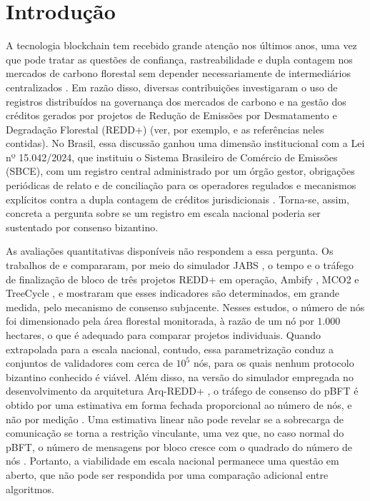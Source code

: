 \section{Introdução}
\label{sec:intro}

A tecnologia blockchain tem recebido grande atenção nos últimos anos, uma vez que pode tratar as questões de confiança, rastreabilidade e dupla contagem nos mercados de carbono florestal sem depender necessariamente de intermediários centralizados \citep{Howson2019ncc,Kotsialou2022}. Em razão disso, diversas contribuições investigaram o uso de registros distribuídos na governança dos mercados de carbono e na gestão dos créditos gerados por projetos de Redução de Emissões por Desmatamento e Degradação Florestal (REDD+) (ver, por exemplo, \citep{Howson2019geoforum,Kotsialou2021,Marke2022,Vilkov2023,He2022} e as referências neles contidas). No Brasil, essa discussão ganhou uma dimensão institucional com a Lei nº 15.042/2024, que instituiu o Sistema Brasileiro de Comércio de Emissões (SBCE), com um registro central administrado por um órgão gestor, obrigações periódicas de relato e de conciliação para os operadores regulados e mecanismos explícitos contra a dupla contagem de créditos jurisdicionais \citep{Lei15042}. Torna-se, assim, concreta a pergunta sobre se um registro em escala nacional poderia ser sustentado por consenso bizantino.

As avaliações quantitativas disponíveis não respondem a essa pergunta. Os trabalhos de \citet{Caburlao2025reic} e \citet{Caburlao2026clei} compararam, por meio do simulador JABS \citep{Yajam2023}, o tempo e o tráfego de finalização de bloco de três projetos REDD+ em operação, Ambify \citep{Ambipar2021}, MCO2 \citep{Moss2020} e TreeCycle \citep{GlobalTree2019}, e mostraram que esses indicadores são determinados, em grande medida, pelo mecanismo de consenso subjacente. Nesses estudos, o número de nós foi dimensionado pela área florestal monitorada, à razão de um nó por $1.000$ hectares, o que é adequado para comparar projetos individuais. Quando extrapolada para a escala nacional, contudo, essa parametrização conduz a conjuntos de validadores com cerca de $10^{5}$ nós, para os quais nenhum protocolo bizantino conhecido é viável. Além disso, na versão do simulador empregada no desenvolvimento da arquitetura Arq-REDD+ , o tráfego de consenso do pBFT é obtido por uma estimativa em forma fechada proporcional ao número de nós, e não por medição . Uma estimativa linear não pode revelar se a sobrecarga de comunicação se torna a restrição vinculante, uma vez que, no caso normal do pBFT, o número de mensagens por bloco cresce com o quadrado do número de nós \citep{Castro1999}. Portanto, a viabilidade em escala nacional permanece uma questão em aberto, que não pode ser respondida por uma comparação adicional entre algoritmos.

